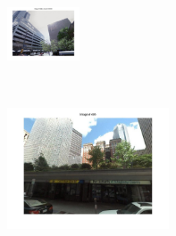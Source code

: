 \begin{minipage}{0.75\linewidth}
\begin{minipage}{\linewidth}
                \colorbox{myRed}{\includegraphics[trim = 35mm 30mm 35mm 30mm, clip=true, height=16mm]{imgs/Pval/exImproved02/improved04.jpg}}
            \end{minipage} 
        \end{minipage}
        \vspace{3mm}
        \\
        \begin{minipage}{0.34\linewidth}
            \centering
            \vspace{0mm}
            \includegraphics[trim = 45mm 40mm 45mm 30mm, clip=true, height=36mm]{imgs/Pval/exImproved03/query.jpg}
        \end{minipage}
